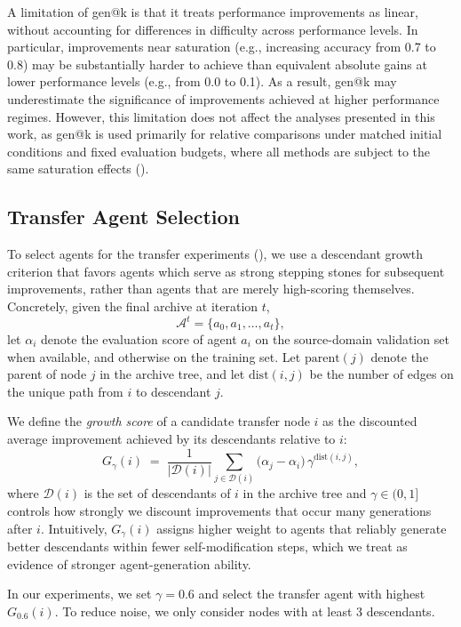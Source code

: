 \documentclass[]{fairmeta}
\begin{document}
A limitation of gen@k is that it treats performance improvements as linear, without accounting for differences in difficulty across performance levels. In particular, improvements near saturation (e.g., increasing accuracy from 0.7 to 0.8) may be substantially harder to achieve than equivalent absolute gains at lower performance levels (e.g., from 0.0 to 0.1). As a result, gen@k may underestimate the significance of improvements achieved at higher performance regimes. However, this limitation does not affect the analyses presented in this work, as gen@k is used primarily for relative comparisons under matched initial conditions and fixed evaluation budgets, where all methods are subject to the same saturation effects ().

\subsection{Transfer Agent Selection}
\label{app:transfer-selection}

To select agents for the transfer experiments (), we use a descendant growth criterion that favors agents which serve as strong stepping stones for subsequent improvements, rather than agents that are merely high-scoring themselves.
Concretely, given the final archive at iteration \(t\),
\[
\mathcal{A}^t = \{a_0, a_1, \dots, a_t\},
\]
let \(\alpha_i\) denote the evaluation score of agent \(a_i\) on the source-domain validation set when available, and otherwise on the training set.
Let \(\mathrm{parent}(j)\) denote the parent of node \(j\) in the archive tree, and let \(\mathrm{dist}(i,j)\) be the number of edges on the unique path from \(i\) to descendant \(j\).

We define the \emph{growth score} of a candidate transfer node \(i\) as the discounted average improvement achieved by its descendants relative to \(i\):
\[
G_\gamma(i)
\;=\;
\frac{1}{|\mathcal{D}(i)|}
\sum_{j \in \mathcal{D}(i)}
\bigl(\alpha_j - \alpha_i\bigr)\,\gamma^{\mathrm{dist}(i,j)},
\]
where \(\mathcal{D}(i)\) is the set of descendants of \(i\) in the archive tree and \(\gamma \in (0,1]\) controls how strongly we discount improvements that occur many generations after \(i\).
Intuitively, \(G_\gamma(i)\) assigns higher weight to agents that reliably generate better descendants within fewer self-modification steps, which we treat as evidence of stronger agent-generation ability.

In our experiments, we set \(\gamma = 0.6\) and select the transfer agent with highest \(G_{0.6}(i)\). To reduce noise, we only consider nodes with at least 3 descendants.
\end{document}
